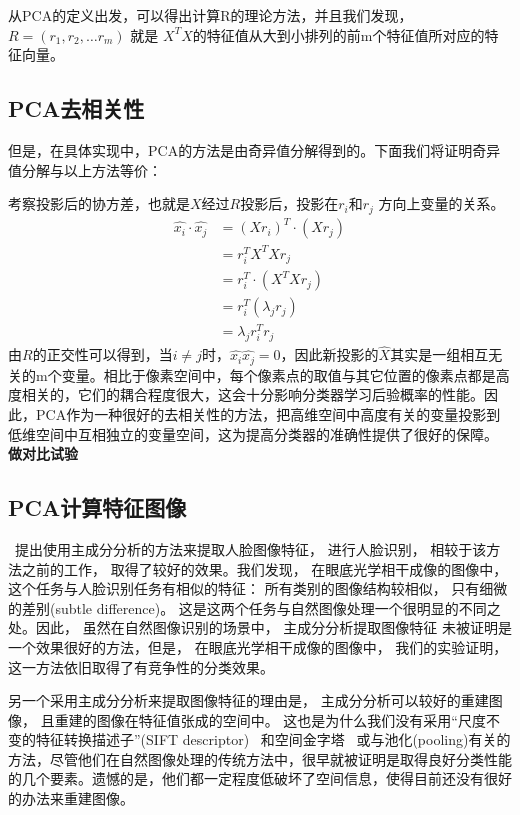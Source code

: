     从PCA的定义出发，可以得出计算R的理论方法，并且我们发现，$R = (r_1, r_2, \dots r_m)$ 就是 $X^T X$的特征值从大到小排列的前m个特征值所对应的特征向量。

    \subsection{PCA去相关性}
    但是，在具体实现中，PCA的方法是由奇异值分解得到的。下面我们将证明奇异值分解与以上方法等价：
    
    考察投影后的协方差，也就是$X$经过$R$投影后，投影在$r_i$和$r_j$ 方向上变量的关系。
    \begin{equation}
    \begin{split}
        \hat{x_i} \cdot \hat{x_j} & = (Xr_i)^T \cdot (Xr_j) \\
        & = r_i^T X^T X r_j \\
        & = r_i^T\cdot(X^T X r_j) \\
        & = r_i^T(\lambda_j r_j) \\
        & = \lambda_j r_i^T r_j 
    \end{split}
    \end{equation}
    由$R$的正交性可以得到，当$i \ne j$时，$\hat{x_i} \hat{x_j} = 0$，因此新投影的$\hat{X}$其实是一组相互无关的m个变量。相比于像素空间中，每个像素点的取值与其它位置的像素点都是高度相关的，它们的耦合程度很大，这会十分影响分类器学习后验概率的性能。因此，PCA作为一种很好的去相关性的方法，把高维空间中高度有关的变量投影到低维空间中互相独立的变量空间，这为提高分类器的准确性提供了很好的保障。 \textbf{做对比试验}
 
    
    \subsection{PCA计算特征图像}
        ~\cite{turk1991eigenfaces}提出使用主成分分析的方法来提取人脸图像特征， 进行人脸识别， 相较于该方法之前的工作， 取得了较好的效果。我们发现， 在眼底光学相干成像的图像中， 这个任务与人脸识别任务有相似的特征： 所有类别的图像结构较相似， 只有细微的差别(subtle difference)。 这是这两个任务与自然图像处理一个很明显的不同之处。因此， 虽然在自然图像识别的场景中， 主成分分析提取图像特征 未被证明是一个效果很好的方法，但是， 在眼底光学相干成像的图像中， 我们的实验证明， 这一方法依旧取得了有竞争性的分类效果。 

        另一个采用主成分分析来提取图像特征的理由是， 主成分分析可以较好的重建图像， 且重建的图像在特征值张成的空间中。  这也是为什么我们没有采用“尺度不变的特征转换描述子”(SIFT descriptor) ~\cite{yang2009linear}和空间金字塔~\cite{lazebnik2006beyond} 或与池化(pooling)有关的方法，尽管他们在自然图像处理的传统方法中，很早就被证明是取得良好分类性能的几个要素。遗憾的是，他们都一定程度低破坏了空间信息，使得目前还没有很好的办法来重建图像。

